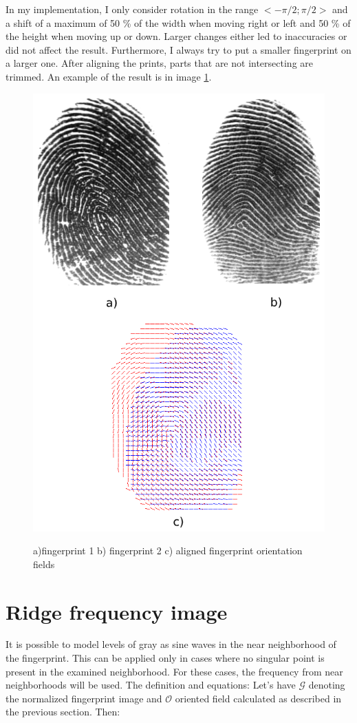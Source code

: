 In my implementation, I only consider rotation in the range $ <-\pi/2; \pi/2> $ and a shift of a maximum of 50 \% of the width when moving right or left and 50 \% of the height when moving up or down. Larger changes either led to inaccuracies or did not affect the result. Furthermore, I always try to put a smaller fingerprint on a larger one. After aligning the prints, parts that are not intersecting are trimmed. An example of the result is in image \ref{fig:prunik}.
\begin{figure}[H]
    \centering
        {\includegraphics[width=0.5\linewidth]{obrazky-figures/prunik.png}}\\
        \caption{a)fingerprint 1 b) fingerprint 2 c) aligned fingerprint orientation fields}
        \label{fig:prunik}
\end{figure}

\section{Ridge frequency image}
It is possible to model levels of gray as sine waves in the near neighborhood of the fingerprint. This can be applied only in cases where no singular point is present in the examined neighborhood. For these cases, the frequency from near neighborhoods will be used. The definition and equations:
Let's have $ \mathcal{G} $ denoting the normalized fingerprint image and $\mathcal{O}$ oriented field calculated as described in the previous section. Then: \cite{ori}


